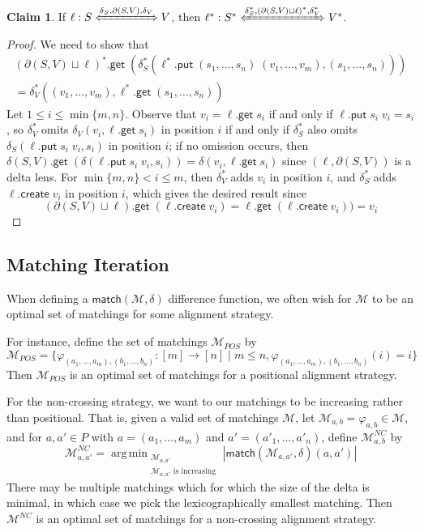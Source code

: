 \documentclass[acmsmall,review,anonymous]{acmart}\settopmatter{printfolios=true,printccs=false,printacmref=false}
\theoremstyle{definition}
\newtheorem{claim}{Claim}
\newcommand{\kw}[1]{\ensuremath{\mathsf{#1}}\xspace}
\newcommand{\get}{\ensuremath{\kw{get}}\xspace}
\newcommand{\pput}{\ensuremath{\kw{put}}\xspace}
\newcommand{\create}{\ensuremath{\kw{create}}\xspace}
\newcommand{\match}{\ensuremath{\kw{match}}\xspace}
\DeclareMathOperator*{\argmin}{arg\,min} %
\begin{document}
\begin{claim}\label{positionalisvalid}
If $\ell: S \xLeftrightarrow{\delta_S, \partial (S, V), \delta_V}
V$, then $\ell^*: S^* \xLeftrightarrow{\delta_{S}^*, (\partial (S, V) \sqcup
\ell)^*, \delta_{V}^*} V^*$.
\end{claim}
\begin{proof}
We need to show that
\begin{multline}
(\partial (S, V) \sqcup \ell)^*.\get \;
(\delta_S^*(\ell^*.\pput \; (s_1, \ldots, s_n) \; (v_1, \ldots,
v_m), (s_1, \ldots, s_n))) \\
= \delta_V^*((v_1, \ldots, v_m), \ell^*.\get \; (s_1, \ldots,
s_n))
\end{multline}
Let $1 \leq i \leq \min\{m, n\}$. Observe that $v_i = \ell.\get \; s_i$ if and
only if $\ell.\pput \; s_i \; v_i = s_i$, so $\delta_V^*$ omits
$\delta_V(v_i, \ell.\get \; s_i)$ in position $i$ if and only if
$\delta_S^*$ also omits $\delta_S(\ell.\pput \; s_i \; v_i, s_i)$ in
position $i$; if no omission occurs, then $\delta(S, V).\get \;
(\delta(\ell.\pput \; s_i \; v_i, s_i)) = \delta(v_i, \ell.\get \; s_i)$ since
$(\ell, \partial(S,V))$ is a delta lens. For $\min\{m,n\} < i \leq m$, then
$\delta_V^*$ adds $v_i$ in position $i$, and $\delta_S^*$ adds
$\ell.\create \; v_i$ in position $i$, which gives the desired result since
$$(\partial (S, V) \sqcup \ell).\get \; (\ell.\create \; v_i) = \ell.\get \;
(\ell.\create \; v_i)) = v_i$$
\end{proof}
\subsection{Matching Iteration}
\iffalse
When defining a $\match(\mathcal{M}, \delta)$ difference function, we often wish for
$\mathcal{M}$ to be an optimal set of matchings for some alignment strategy.

For instance, define the set of matchings $\mathcal{M}_{POS}$ by
$$\mathcal{M}_{POS} = \{\varphi_{(a_1, \ldots, a_m), (b_1, \ldots, b_n)}:[m]
\longrightarrow [n] \; | \; m \leq n, \varphi_{(a_1, \ldots, a_m), (b_1,
\ldots, b_n)}(i) = i\}$$ Then $\mathcal{M}_{POS}$ is an optimal set of
matchings for a positional alignment strategy.

For the non-crossing strategy, we want to our matchings to be increasing rather
than positional. That is, given a valid set of matchings $\mathcal{M}$, let
$\mathcal{M}_{a, b} = \varphi_{a, b} \in \mathcal{M}$, and for $a, a' \in P$
with $a=(a_1, \ldots, a_m)$ and $a'=(a'_1, \ldots, a'_n)$, define
$\mathcal{M}^{NC}_{a, b}$ by
$$\mathcal{M}^{NC}_{a, a'} = \argmin_{\substack{\mathcal{M}_{a, a'} \\
\mathcal{M}_{a, a'} \text{ is increasing}}} |\match(\mathcal{M}_{a, a'},
\delta)(a, a')|$$
There may be multiple matchings which for which the size of the delta is
minimal, in which case we pick the lexicographically smallest matching.
Then $\mathcal{M}^{NC}$ is an optimal set of matchings for a non-crossing
alignment strategy.
\end{document}
